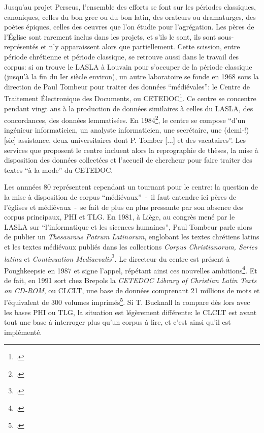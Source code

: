 Jusqu'au projet Perseus, l'ensemble des efforts se font sur les périodes classiques, canoniques, celles du bon grec ou du bon latin, des orateurs ou dramaturges, des poètes épiques, celles des oeuvres que l'on étudie pour l'agrégation. Les pères de l'Église sont rarement inclus dans les projets, et s'ils le sont, ils sont sous-représentés et n'y apparaissent alors que partiellement. Cette scission, entre période chrétienne et période classique, se retrouve aussi dans le travail des corpus: si on trouve le LASLA à Louvain pour s'occuper de la période classique (jusqu'à la fin du Ier siècle environ), un autre laboratoire se fonde en 1968 sous la direction de Paul Tombeur pour traiter des données \enquote{médiévales}: le Centre de Traitement Électronique des Documents, ou CETEDOC\footcite[p. 70]{gueret_analyse_1977}. Ce centre se concentre pendant vingt ans à la production de données similaires à celles du LASLA, des concordances, des données lemmatisées. En 1984\footcite{iogna-prat_centre_1984}, le centre se compose \enquote{d'un ingénieur informaticien, un analyste informaticien, une secrétaire, une (demi-!) {[sic]} assistance, deux universitaires dont P. Tomber {[...]} et des vacataires}. Les services que proposent le centre incluent alors la reprographie de thèses, la mise à disposition des données collectées et l'accueil de chercheur pour faire traiter des textes \enquote{à la mode} du CETEDOC.

Les annnées 80 représentent cependant un tournant pour le centre: la question de la mise à disposition de corpus \enquote{médiévaux}~-~il faut entendre ici pères de l'églises et médiévaux~-~se fait de plus en plus pressante par son absence des corpus principaux, PHI et TLG. En 1981, à Liège, au congrès mené par le LASLA sur \enquote{l'informatique et les sicences humaines}, Paul Tombeur parle alors de publier un \textit{Thesauraus Patrum Latinorum}, englobant les textes chrétiens latins et les textes médiévaux publiés dans les collections \textit{Corpus Christianorum, Series latina} et \textit{Continuation Mediaevalis}\footcite{tombeur_constitution_1981}. Le directeur du centre est présent à Poughkeepsie en 1987 et signe l'appel, répétant ainsi ces nouvelles ambitions\footcite{burnard_report_1988}. Et de fait, en 1991 sort chez Brepols la \textit{CETEDOC Library of Christian Latin Texts on CD-ROM}, ou CLCLT, une base de données comprenant 21 millions de mots et l'équivalent de 300 volumes imprimés\footcite[p. 90]{bucknall_review_1994}. Si T. Bucknall la compare dès lors avec les bases PHI ou TLG, la situation est légèrement différente: le CLCLT est avant tout une base à interroger plus qu'un corpus à lire, et c'est ainsi qu'il est implémenté.

